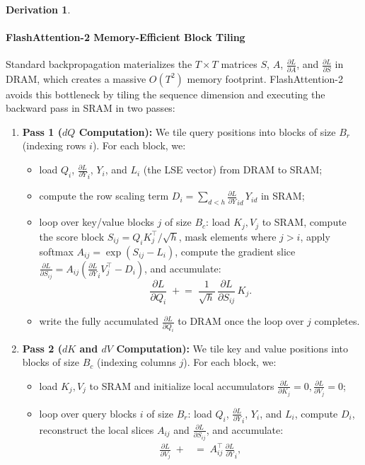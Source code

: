\documentclass[letterpaper, 10 pt, conference]{ieeeconf}
\newcommand{\pdv}[2]{\frac{\partial #1}{\partial #2}}
\newcommand{\dL}[1]{\pdv{L}{#1}}
\theoremstyle{definition}
\newtheorem*{derivation}{Derivation}
\begin{document}
\begin{derivation}
  \paragraph{FlashAttention-2 Memory-Efficient Block Tiling}
  Standard backpropagation materializes the $T \times T$ matrices $S$, $A$, $\dL{A}$, and $\dL{S}$ in DRAM, which creates a massive $O(T^2)$ memory footprint. FlashAttention-2 avoids this bottleneck by tiling the sequence dimension and executing the backward pass in SRAM in two passes:
  \begin{enumerate}
    \item \textbf{Pass 1 ($dQ$ Computation):} We tile query positions into blocks of size $B_r$ (indexing rows $i$). For each block, we:
          \begin{itemize}
            \item load $Q_i$, $\dL{Y}_i$, $Y_i$, and $L_i$ (the LSE vector) from DRAM to SRAM;
            \item compute the row scaling term $D_i = \sum_{d<h} \dL{Y}_{id}\,Y_{id}$ in SRAM;
            \item loop over key/value blocks $j$ of size $B_c$: load $K_j, V_j$ to SRAM, compute the score block $S_{ij} = Q_i K_j^{\top}/\sqrt{h}$, mask elements where $j > i$, apply softmax $A_{ij} = \exp(S_{ij} - L_i)$, compute the gradient slice $\dL{S_{ij}} = A_{ij} (\dL{Y}_i V_j^{\top} - D_i)$, and accumulate:
                  \begin{equation}
                    \dL{Q_i} \;\mathrel{+}=\; \frac{1}{\sqrt{h}}\,\dL{S_{ij}}\,K_j.
                  \end{equation}
            \item write the fully accumulated $\dL{Q_i}$ to DRAM once the loop over $j$ completes.
          \end{itemize}
    \item \textbf{Pass 2 ($dK$ and $dV$ Computation):} We tile key and value positions into blocks of size $B_c$ (indexing columns $j$). For each block, we:
          \begin{itemize}
            \item load $K_j, V_j$ to SRAM and initialize local accumulators $\dL{K_j} = 0, \dL{V_j} = 0$;
            \item loop over query blocks $i$ of size $B_r$: load $Q_i$, $\dL{Y}_i$, $Y_i$, and $L_i$, compute $D_i$, reconstruct the local slices $A_{ij}$ and $\dL{S_{ij}}$, and accumulate:
                  \begin{align}
                    \dL{V_j} \;\mathrel{+} & =\; A_{ij}^{\top}\,\dL{Y}_i,                     \\

\end{align}
\end{itemize}
\end{enumerate}
\end{derivation}
\end{document}
